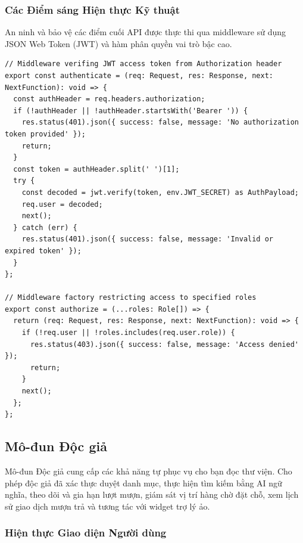 \subsubsection{Các Điểm sáng Hiện thực Kỹ thuật}

An ninh và bảo vệ các điểm cuối API được thực thi qua middleware sử dụng JSON Web Token (JWT) và hàm phân quyền vai trò bậc cao.

\begin{lstlisting}[caption={Middleware Xác thực và Phân quyền JWT (backend-express/src/middlewares/auth.middleware.ts)}, label={lst:auth_middleware}]
// Middleware verifing JWT access token from Authorization header
export const authenticate = (req: Request, res: Response, next: NextFunction): void => {
  const authHeader = req.headers.authorization;
  if (!authHeader || !authHeader.startsWith('Bearer ')) {
    res.status(401).json({ success: false, message: 'No authorization token provided' });
    return;
  }
  const token = authHeader.split(' ')[1];
  try {
    const decoded = jwt.verify(token, env.JWT_SECRET) as AuthPayload;
    req.user = decoded;
    next();
  } catch (err) {
    res.status(401).json({ success: false, message: 'Invalid or expired token' });
  }
};

// Middleware factory restricting access to specified roles
export const authorize = (...roles: Role[]) => {
  return (req: Request, res: Response, next: NextFunction): void => {
    if (!req.user || !roles.includes(req.user.role)) {
      res.status(403).json({ success: false, message: 'Access denied' });
      return;
    }
    next();
  };
};
\end{lstlisting}

\subsection{Mô-đun Độc giả}

Mô-đun Độc giả cung cấp các khả năng tự phục vụ cho bạn đọc thư viện. Cho phép độc giả đã xác thực duyệt danh mục, thực hiện tìm kiếm bằng AI ngữ nghĩa, theo dõi và gia hạn lượt mượn, giám sát vị trí hàng chờ đặt chỗ, xem lịch sử giao dịch mượn trả và tương tác với widget trợ lý ảo.

\subsubsection{Hiện thực Giao diện Người dùng}


